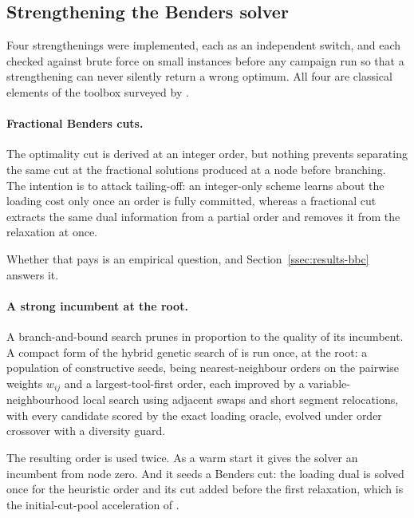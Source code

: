 \subsection{Strengthening the Benders solver}\label{ssec:accel}

Four strengthenings were implemented, each as an independent switch, and each checked
against brute force on small instances before any campaign run so that a strengthening
can never silently return a wrong optimum. All four are classical elements of the
toolbox surveyed by \citet{Rahmaniani2017}.

\paragraph{Fractional Benders cuts.}
The optimality cut is derived at an integer order, but nothing prevents separating the
same cut at the fractional solutions produced at a node before branching. The
intention is to attack tailing-off: an integer-only scheme learns about the loading
cost only once an order is fully committed, whereas a fractional cut extracts the same
dual information from a partial order and removes it from the relaxation at once.

Whether that pays is an empirical question, and Section~\ref{ssec:results-bbc} answers
it.

\paragraph{A strong incumbent at the root.}
A branch-and-bound search prunes in proportion to the quality of its incumbent. A
compact form of the hybrid genetic search of \citet{Mecler2021} is run once, at the
root: a population of constructive seeds, being nearest-neighbour orders on the
pairwise weights $w_{ij}$ and a largest-tool-first order, each improved by a
variable-neighbourhood local search using adjacent swaps and short segment
relocations, with every candidate scored by the exact loading oracle, evolved under
order crossover with a diversity guard.

The resulting order is used twice. As a warm start it gives the solver an incumbent
from node zero. And it seeds a Benders cut: the loading dual is solved once for the
heuristic order and its cut added before the first relaxation, which is the
initial-cut-pool acceleration of \citet{Rahmaniani2017}.

